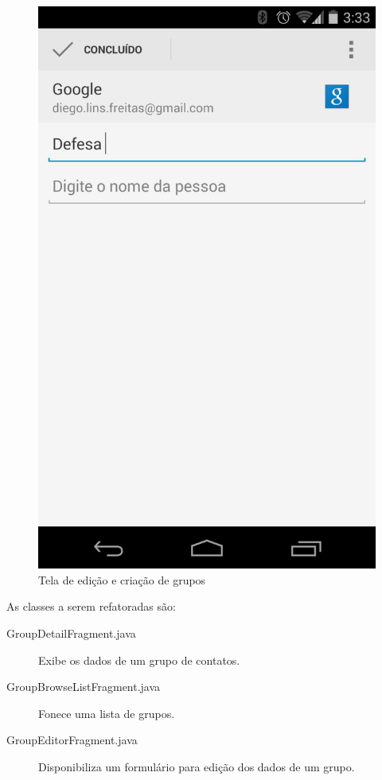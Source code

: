 \begin{figure}[!h]
\begin{minipage}{.5\textwidth}
	\includegraphics[scale=0.25]{img/contacts_edit.png}
	\caption{Tela de edição e criação de grupos} 
	\label{fig:groups_edit}
\end{minipage}
\end{figure}

As classes a serem refatoradas são:
\begin{description}
\item[GroupDetailFragment.java] Exibe os dados de um grupo de contatos.
\item[GroupBrowseListFragment.java] Fonece uma lista de grupos.
\item[GroupEditorFragment.java] Disponibiliza um formulário para edição dos
dados de um grupo.
\end{description}

